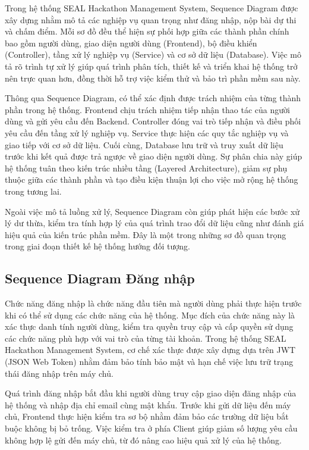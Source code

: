 Trong hệ thống SEAL Hackathon Management System, Sequence Diagram được xây dựng nhằm mô tả các nghiệp vụ quan trọng như đăng nhập, nộp bài dự thi và chấm điểm. Mỗi sơ đồ đều thể hiện sự phối hợp giữa các thành phần chính bao gồm người dùng, giao diện người dùng (Frontend), bộ điều khiển (Controller), tầng xử lý nghiệp vụ (Service) và cơ sở dữ liệu (Database). Việc mô tả rõ trình tự xử lý giúp quá trình phân tích, thiết kế và triển khai hệ thống trở nên trực quan hơn, đồng thời hỗ trợ việc kiểm thử và bảo trì phần mềm sau này.

Thông qua Sequence Diagram, có thể xác định được trách nhiệm của từng thành phần trong hệ thống. Frontend chịu trách nhiệm tiếp nhận thao tác của người dùng và gửi yêu cầu đến Backend. Controller đóng vai trò tiếp nhận và điều phối yêu cầu đến tầng xử lý nghiệp vụ. Service thực hiện các quy tắc nghiệp vụ và giao tiếp với cơ sở dữ liệu. Cuối cùng, Database lưu trữ và truy xuất dữ liệu trước khi kết quả được trả ngược về giao diện người dùng. Sự phân chia này giúp hệ thống tuân theo kiến trúc nhiều tầng (Layered Architecture), giảm sự phụ thuộc giữa các thành phần và tạo điều kiện thuận lợi cho việc mở rộng hệ thống trong tương lai.

Ngoài việc mô tả luồng xử lý, Sequence Diagram còn giúp phát hiện các bước xử lý dư thừa, kiểm tra tính hợp lý của quá trình trao đổi dữ liệu cũng như đánh giá hiệu quả của kiến trúc phần mềm. Đây là một trong những sơ đồ quan trọng trong giai đoạn thiết kế hệ thống hướng đối tượng.

\subsection{Sequence Diagram Đăng nhập}

Chức năng đăng nhập là chức năng đầu tiên mà người dùng phải thực hiện trước khi có thể sử dụng các chức năng của hệ thống. Mục đích của chức năng này là xác thực danh tính người dùng, kiểm tra quyền truy cập và cấp quyền sử dụng các chức năng phù hợp với vai trò của từng tài khoản. Trong hệ thống SEAL Hackathon Management System, cơ chế xác thực được xây dựng dựa trên JWT (JSON Web Token) nhằm đảm bảo tính bảo mật và hạn chế việc lưu trữ trạng thái đăng nhập trên máy chủ.

Quá trình đăng nhập bắt đầu khi người dùng truy cập giao diện đăng nhập của hệ thống và nhập địa chỉ email cùng mật khẩu. Trước khi gửi dữ liệu đến máy chủ, Frontend thực hiện kiểm tra sơ bộ nhằm đảm bảo các trường dữ liệu bắt buộc không bị bỏ trống. Việc kiểm tra ở phía Client giúp giảm số lượng yêu cầu không hợp lệ gửi đến máy chủ, từ đó nâng cao hiệu quả xử lý của hệ thống.

